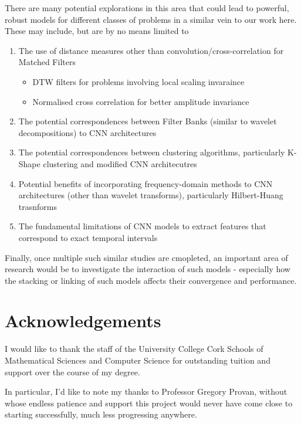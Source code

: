 \documentclass[9pt,conference]{IEEEtran}
\begin{document}
There are many potential explorations in this area that could lead to powerful, robust models for different classes of problems in a similar vein to our work here. These may include, but are by no means limited to
\begin{enumerate}
    \item The use of distance measures other than convolution/cross-correlation for Matched Filters
    \begin{itemize}
         \item DTW filters for problems involving local scaling invaraince
         \item Normalised cross correlation for better amplitude invariance
        \end{itemize}
    \item The potential correspondences between Filter Banks (similar to wavelet decompositions) to CNN architectures
    \item The potential correspondences between clustering algorithms, particularly K-Shape\cite{paparrizos2015k} clustering and modified CNN architecutres
    \item Potential benefits of incorporating frequency-domain methods to CNN architectures (other than wavelet transforms), particularly Hilbert-Huang trasnforms
    \item The fundamental limitations of CNN models to extract features that correspond to exact temporal intervals
\end{enumerate}

Finally, once multiple such similar studies are cmopleted, an important area of research would be to investigate the interaction of such models - especially how the stacking or linking of such models affects their convergence and performance.

\section{Acknowledgements}
I would like to thank the staff of the University College Cork Schools of Mathematical Sciences and Computer Science for outstanding tuition and support over the course of my degree.

\vspace{0.5cm}

In particular, I'd like to note my thanks to Professor Gregory Provan, without whose endless patience and support this project would never have come close to starting successfully, much less progressing anywhere.
\end{document}
